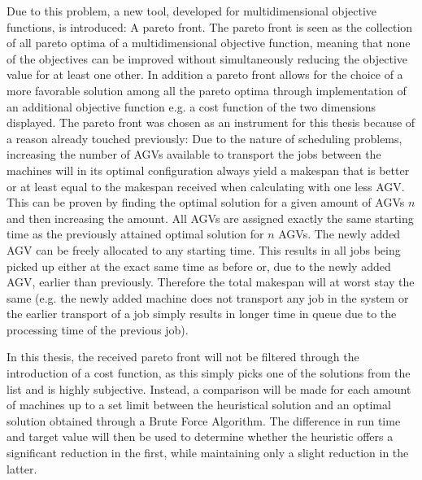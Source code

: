 Due to this problem, a new tool, developed for multidimensional objective functions, is introduced: A pareto front. The pareto front is seen as the collection of all pareto optima of a multidimensional objective function, meaning that none of the objectives can be improved without simultaneously reducing the objective value for at least one other. In addition a pareto front allows
for the choice of a more favorable solution among all the pareto optima through implementation of an additional objective function e.g. a cost function of the two dimensions
displayed. The pareto front was chosen as an instrument for this thesis because of a reason already touched
previously: Due to the nature of scheduling problems, increasing the number of AGVs available to transport the jobs between the machines will in
its optimal configuration always yield a makespan that is better or at least equal to the makespan received when calculating with one less
AGV. This can be proven by finding the optimal solution for a given amount of AGVs \(n\) and then increasing the amount. All AGVs are assigned
exactly the same starting time as the previously attained optimal solution for \(n\) AGVs. The newly added AGV can be freely allocated to any starting
time. This results in all jobs being picked up either at the exact same time as before or, due to the newly added AGV, earlier than previously.
Therefore the total makespan will at worst stay the same (e.g. the newly added machine does not transport any job in the system or the
earlier transport of a job simply results in longer time in queue due to the processing time of the previous job).

In this thesis, the received pareto front will not be filtered through the introduction of a cost function, as this simply picks one of the solutions
from the list and is highly subjective. Instead, a comparison will be made for each amount of machines up to a set limit between the heuristical solution and an optimal
solution obtained through a Brute Force Algorithm. The difference in run time and target value will then be used to determine whether the heuristic
offers a significant reduction in the first, while maintaining only a slight reduction in the latter.

